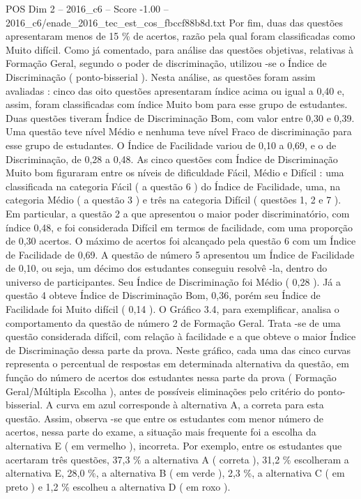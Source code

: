 \begin{textsample}{POS Dim 2 – 2016\_c6 – Score -1.00 – 2016\_c6/enade\_2016\_tec\_est\_cos\_fbccf88b8d.txt}
Por fim, duas das questões apresentaram menos de 15 \% de acertos, razão pela qual foram classificadas como Muito difícil.
Como já comentado, para análise das questões objetivas, relativas à Formação Geral, segundo o poder de discriminação, utilizou -se o Índice de Discriminação ( ponto-bisserial ).
Nesta análise, as questões foram assim avaliadas : cinco das oito questões apresentaram índice acima ou igual a 0,40 e, assim, foram classificadas com índice Muito bom para esse grupo de estudantes.
Duas questões tiveram Índice de Discriminação Bom, com valor entre 0,30 e 0,39.
Uma questão teve nível Médio e nenhuma teve nível Fraco de discriminação para esse grupo de estudantes.
O Índice de Facilidade variou de 0,10 a 0,69, e o de Discriminação, de 0,28 a 0,48.
As cinco questões com Índice de Discriminação Muito bom figuraram entre os níveis de dificuldade Fácil, Médio e Difícil : uma classificada na categoria Fácil ( a questão 6 ) do Índice de Facilidade, uma, na categoria Médio ( a questão 3 ) e três na categoria Difícil ( questões 1, 2 e 7 ).
Em particular, a questão 2 a que apresentou o maior poder discriminatório, com índice 0,48, e foi considerada Difícil em termos de facilidade, com uma proporção de 0,30 acertos.
O máximo de acertos foi alcançado pela questão 6 com um Índice de Facilidade de 0,69.
A questão de número 5 apresentou um Índice de Facilidade de 0,10, ou seja, um décimo dos estudantes conseguiu resolvê -la, dentro do universo de participantes.
Seu Índice de Discriminação foi Médio ( 0,28 ).
Já a questão 4 obteve Índice de Discriminação Bom, 0,36, porém seu Índice de Facilidade foi Muito difícil ( 0,14 ).
O Gráfico 3.4, para exemplificar, analisa o comportamento da questão de número 2 de Formação Geral.
Trata -se de uma questão considerada difícil, com relação à facilidade e a que obteve o maior Índice de Discriminação dessa parte da prova.
Neste gráfico, cada uma das cinco curvas representa o percentual de respostas em determinada alternativa da questão, em função do número de acertos dos estudantes nessa parte da prova ( Formação Geral/Múltipla Escolha ), antes de possíveis eliminações pelo critério do ponto-bisserial.
A curva em azul corresponde à alternativa A, a correta para esta questão.
Assim, observa -se que entre os estudantes com menor número de acertos, nessa parte do exame, a situação mais frequente foi a escolha da alternativa E ( em vermelho ), incorreta.
Por exemplo, entre os estudantes que acertaram três questões, 37,3 \% a alternativa A ( correta ), 31,2 \% escolheram a alternativa E, 28,0 \%, a alternativa B ( em verde ), 2,3 \%, a alternativa C ( em preto ) e 1,2 \% escolheu a alternativa D ( em roxo ).

\end{textsample}
